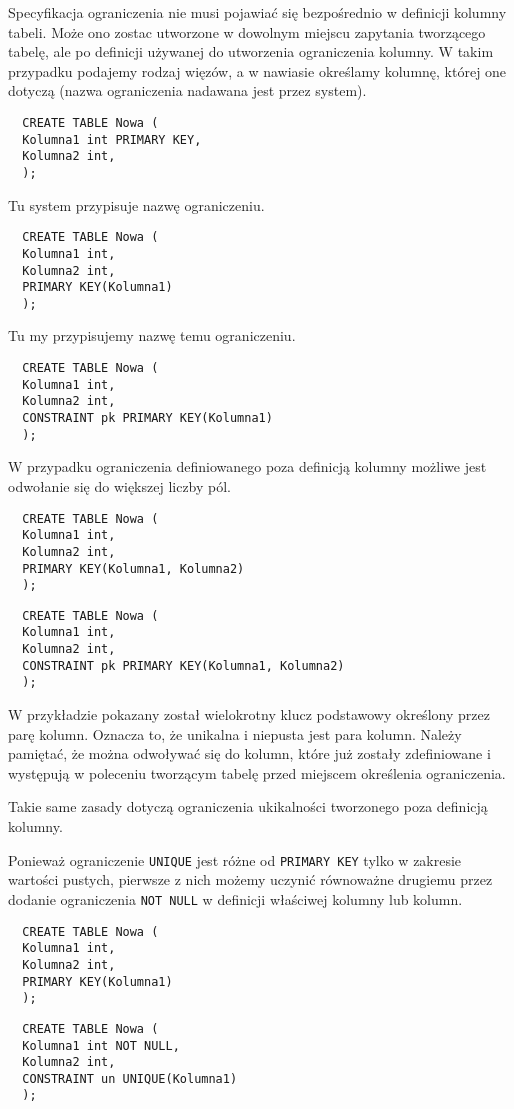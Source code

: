 \documentclass[a4paper]{article}
\begin{document}
Specyfikacja ograniczenia nie musi pojawiać się bezpośrednio w definicji kolumny tabeli. Może ono zostac utworzone w dowolnym miejscu zapytania tworzącego tabelę, ale po definicji używanej do utworzenia ograniczenia kolumny.
W takim przypadku podajemy rodzaj więzów, a w nawiasie określamy kolumnę, której one dotyczą (nazwa ograniczenia nadawana jest przez system).

\begin{verbatim}
  CREATE TABLE Nowa (
  Kolumna1 int PRIMARY KEY,
  Kolumna2 int,
  );
\end{verbatim}

Tu system przypisuje nazwę ograniczeniu.

\begin{verbatim}
  CREATE TABLE Nowa (
  Kolumna1 int,
  Kolumna2 int,
  PRIMARY KEY(Kolumna1)
  );
\end{verbatim}

Tu my przypisujemy nazwę temu ograniczeniu.

\begin{verbatim}
  CREATE TABLE Nowa (
  Kolumna1 int,
  Kolumna2 int,
  CONSTRAINT pk PRIMARY KEY(Kolumna1)
  );
\end{verbatim}

W przypadku ograniczenia definiowanego poza definicją kolumny możliwe jest odwołanie się do większej liczby pól.

\begin{verbatim}
  CREATE TABLE Nowa (
  Kolumna1 int,
  Kolumna2 int,
  PRIMARY KEY(Kolumna1, Kolumna2)
  );
\end{verbatim}

\begin{verbatim}
  CREATE TABLE Nowa (
  Kolumna1 int,
  Kolumna2 int,
  CONSTRAINT pk PRIMARY KEY(Kolumna1, Kolumna2)
  );
\end{verbatim}

W przykładzie pokazany został wielokrotny klucz podstawowy określony przez parę kolumn. Oznacza to, że unikalna i niepusta jest para kolumn.
Należy pamiętać, że można odwoływać się do kolumn, które już zostały zdefiniowane i występują w poleceniu tworzącym tabelę przed miejscem określenia ograniczenia.

Takie same zasady dotyczą ograniczenia ukikalności tworzonego poza definicją kolumny.

Ponieważ ograniczenie {\tt UNIQUE} jest różne od {\tt PRIMARY KEY} tylko w zakresie wartości pustych, pierwsze z nich możemy uczynić równoważne drugiemu przez dodanie ograniczenia {\tt NOT NULL} w definicji właściwej kolumny lub kolumn.

\begin{verbatim}
  CREATE TABLE Nowa (
  Kolumna1 int,
  Kolumna2 int,
  PRIMARY KEY(Kolumna1)
  );
\end{verbatim}

\begin{verbatim}
  CREATE TABLE Nowa (
  Kolumna1 int NOT NULL,
  Kolumna2 int,
  CONSTRAINT un UNIQUE(Kolumna1)
  );
\end{verbatim}
\end{document}
